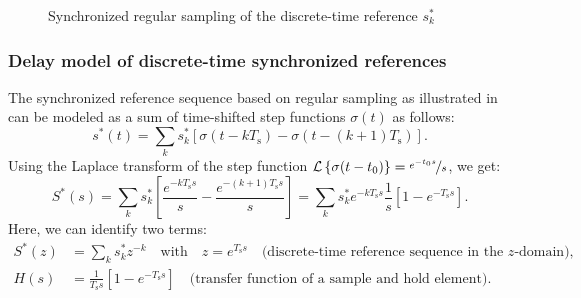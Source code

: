 \begin{frame}[t]
\begin{figure}
        \caption{Synchronized regular sampling of the discrete-time reference $s_k^*$}
        \label{fig:synchronized_references_regular_sampling}
    \end{figure}
\end{frame}

\begin{frame}
    \frametitle{Delay model of discrete-time synchronized references}
    The synchronized reference sequence based on regular sampling as illustrated in  can be modeled as a sum of time-shifted step functions $\sigma(t)$ as follows:
    \begin{equation}
        s^*(t) = \sum_{k} s_k^* \left[ \sigma\left(t - kT_\mathrm{s}\right) - \sigma\left(t - (k+1)T_\mathrm{s}\right) \right].
    \end{equation}\pause
    Using the Laplace transform of the step function $\mathcal{L}\left\{\sigma(t-t_0)\right\}=\nicefrac{e^{-t_0s}}{s}$, we get:
    \begin{equation}
        S^*(s) = \sum_{k} s_k^* \left[ \frac{e^{-kT_\mathrm{s}s}}{s} - \frac{e^{-(k+1)T_\mathrm{s}s}}{s} \right] = \sum_{k} s_k^*e^{-kT_\mathrm{s}s} \frac{1}{s}\left[1  - e^{-T_\mathrm{s}s} \right].
    \end{equation}\pause
    Here, we can identify two terms:
    \begin{align*}
        S^*(z) & = \sum_{k} s_k^*z^{-k} \quad \text{with} \quad z = e^{T_\mathrm{s}s} \quad \text{(discrete-time reference sequence in the $z$-domain),} \\
        H(s)   & = \frac{1}{T_\mathrm{s}s}\left[1  - e^{-T_\mathrm{s}s} \right] \quad \text{(transfer function of a sample and hold element)}.
    \end{align*}
\end{frame}

